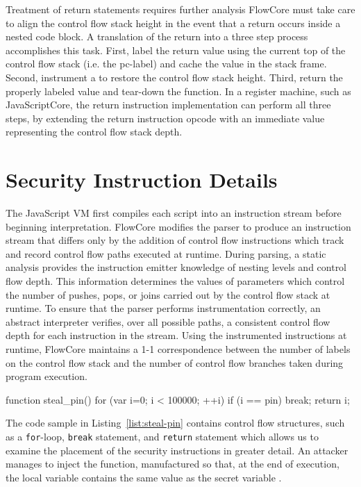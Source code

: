 Treatment of return statements requires further analysis
FlowCore must take care to align the control flow stack height in the event that a return occurs inside a nested code block.
A translation of the return into a three step process accomplishes this task.
First, label the return value using the current top of the control flow stack (i.e. the pc-label) and cache the value in the stack frame.
Second, instrument a \popj to restore the control flow stack height.
Third, return the properly labeled value and tear-down the function.
In a register machine, such as JavaScriptCore, the return instruction implementation can perform all three steps, by extending the return instruction opcode with an immediate value representing the control flow stack depth.

\section{Security Instruction Details}

The JavaScript VM first compiles each script into an instruction stream before beginning interpretation.
FlowCore modifies the parser to produce an instruction stream that differs only by the addition of control flow instructions which track and record control flow paths executed at runtime.
During parsing, a static analysis provides the instruction emitter knowledge of nesting levels and control flow depth.
This information determines the values of parameters which control the number of pushes, pops, or joins carried out by the control flow stack at runtime.
To ensure that the parser performs instrumentation correctly, an abstract interpreter verifies, over all possible paths, a consistent control flow depth for each instruction in the stream.
Using the instrumented instructions at runtime, FlowCore maintains a 1-1 correspondence between the number of labels on the control flow stack and the number of control flow branches taken during program execution.

\begin{jscode}
function steal_pin() {
  for (var i=0; i < 100000; ++i) {
    if (i == pin) break;
  }
  return i;
}
\end{jscode}

The code sample in Listing~\ref{list:steal-pin} contains control flow structures, such as a \texttt{for}-loop, \texttt{break} statement, and \texttt{return} statement which allows us to examine the placement of the security instructions in greater detail.
An attacker manages to inject the  function, manufactured so that, at the end of execution, the local variable  contains the same value as the secret variable .

